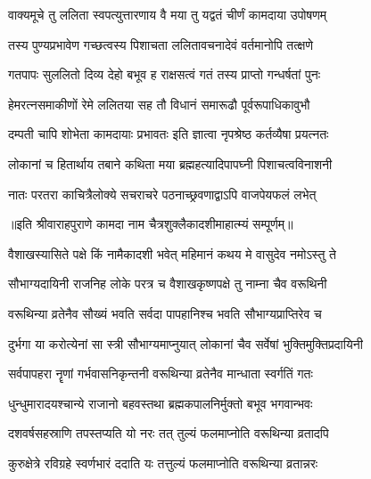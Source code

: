 \twolineshloka
{वाक्यमूचे तु ललिता स्वपत्युत्तारणाय वै}
{मया तु यद्वतं चीर्णं कामदाया उपोषणम्} %

\twolineshloka
{तस्य पुण्यप्रभावेण गच्छत्वस्य पिशाचता}
{ललितावचनादेवं वर्तमानोपि तत्क्षणे} %

\twolineshloka
{गतपापः सुललितो दिव्य देहो बभूव ह}
{राक्षसत्वं गतं तस्य प्राप्तो गन्धर्षतां पुनः} %

\twolineshloka
{हेमरत्नसमाकीणों रेमे ललितया सह}
{तौ विधानं समारूढौ पूर्वरूपाधिकावुभौ} %

\twolineshloka
{दम्पती चापि शोभेता कामदायाः प्रभावतः}
{इति ज्ञात्वा नृपश्रेष्ठ कर्तव्यैषा प्रयत्नतः} %

\twolineshloka
{लोकानां च हितार्थाय तबाने कथिता मया}
{ब्रह्महत्यादिपापघ्नी पिशाचत्वविनाशनी} %

\twolineshloka
{नातः परतरा काचित्रैलोक्ये सचराचरे}
{पठनाच्छ्रवणाद्वाऽपि वाजपेयफलं लभेत्} %

॥इति श्रीवाराहपुराणे कामदा नाम चैत्रशुक्लैकादशीमाहात्म्यं सम्पूर्णम्॥


\hyperref[sec:ekadashi_mahatmyam_vrata_raja]{\closesub}
\clearpage

\label{sec:vrata-raja-vaishakha-krishna-varuthini}


\twolineshloka
{वैशाखस्यासिते पक्षे किं नामैकादशी भवेत्}
{महिमानं कथय मे वासुदेव नमोऽस्तु ते} %


\twolineshloka
{सौभाग्यदायिनी राजनिह लोके परत्र च}
{वैशाखकृष्णपक्षे तु नाम्ना चैव वरूथिनी} %

\twolineshloka
{वरूथिन्या व्रतेनैव सौख्यं भवति सर्वदा}
{पापहानिश्च भवति सौभाग्यप्राप्तिरेव च} %

\twolineshloka
{दुर्भगा या करोत्येनां सा स्त्री सौभाग्यमाप्नुयात्}
{लोकानां चैव सर्वेषां भुक्तिमुक्तिप्रदायिनी} %

\twolineshloka
{सर्वपापहरा नॄणां गर्भवासनिकृन्तनी}
{वरूथिन्या व्रतेनैव मान्धाता स्वर्गतिं गतः} %

\twolineshloka
{धुन्धुमारादयश्चान्ये राजानो बहवस्तथा}
{ब्रह्मकपालनिर्मुक्तो बभूव भगवान्भवः} %

\twolineshloka
{दशवर्षसहस्राणि तपस्तप्यति यो नरः}
{तत् तुल्यं फलमाप्नोति वरूथिन्या व्रतादपि} %

\twolineshloka
{कुरुक्षेत्रे रविग्रहे स्वर्णभारं ददाति यः}
{तत्तुल्यं फलमाप्नोति वरूथिन्या व्रतान्नरः} %

